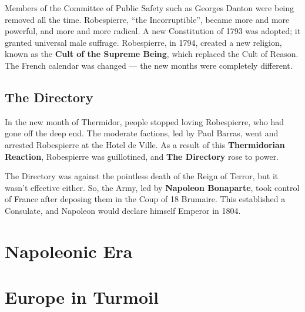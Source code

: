 Members of the Committee of Public Safety such as Georges Danton were being removed all the time.
Robespierre, ``the Incorruptible'', became more and more powerful, and more and more radical.
A new Constitution of 1793 was adopted; it granted universal male suffrage.
Robespierre, in 1794, created a new religion, known as the \textbf{Cult of the Supreme Being},
which replaced the Cult of Reason.
The French calendar was changed --- the new months were completely different.

\subsection*{The Directory}

In the new month of Thermidor, people stopped loving Robespierre, who had gone off the deep end.
The moderate factions, led by Paul Barras, went and arrested Robespierre at the Hotel de Ville.
As a result of this \textbf{Thermidorian Reaction}, Robespierre was guillotined,
and \textbf{The Directory} rose to power.

The Directory was against the pointless death of the Reign of Terror, but it wasn't effective either.
So, the Army, led by \textbf{Napoleon Bonaparte},
took control of France after deposing them in the Coup of 18 Brumaire.
This established a Consulate, and Napoleon would declare himself Emperor in 1804.

\section{Napoleonic Era}

\section{Europe in Turmoil}

